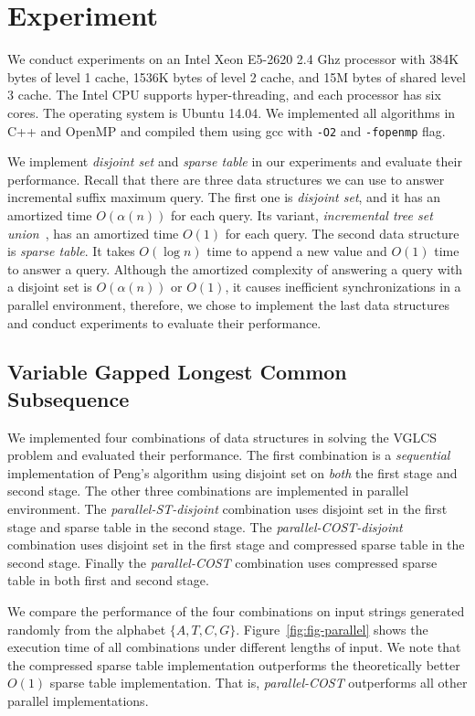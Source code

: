 \section{Experiment}
\label{sec:Experiment}

We conduct experiments on an Intel Xeon E5-2620 2.4 Ghz processor with
384K bytes of level 1 cache, 1536K bytes of level 2 cache, and 15M
bytes of shared level 3 cache.  The Intel CPU supports
hyper-threading, and each processor has six cores.  The operating
system is Ubuntu 14.04.  We implemented all algorithms in C++ and
OpenMP and compiled them using gcc with {\tt -O2} and {\tt -fopenmp}
flag.

We implement {\em disjoint set} and {\em sparse table} in our
experiments and evaluate their performance.  Recall that there are three
data structures we can use to answer incremental suffix maximum query.
The first one is {\em disjoint set}, and it has an amortized time
$O(\alpha(n))$ for each query.  Its variant, {\em incremental   tree set
union}~\cite{Gabow1983ALA}, has an amortized time $O(1)$ for each query.
The second data structure is {\em sparse table}.  It takes $O(\log n)$
time to append a new value and $O(1)$ time to answer a query.  Although
the amortized complexity of answering a query with a disjoint set is
$O(\alpha(n))$ or $O(1)$, it causes inefficient synchronizations in a
parallel environment, therefore, we chose to implement the last data
structures and conduct experiments to evaluate their performance.

\subsection{Variable Gapped Longest Common Subsequence}

We implemented four combinations of data structures in solving the
VGLCS problem and evaluated their performance.  The first combination
is a {\em sequential} implementation of Peng's algorithm using
disjoint set on {\em both} the first stage and second stage.  The
other three combinations are implemented in parallel environment.  The
{\em parallel-ST-disjoint} combination uses disjoint set in the first
stage and sparse table in the second stage.  The {\em
  parallel-COST-disjoint} combination uses disjoint set in the first
stage and compressed sparse table in the second stage.  Finally the
{\em parallel-COST} combination uses compressed sparse table in both
first and second stage.

We compare the performance of the four combinations on input strings
generated randomly from the alphabet $\{A, T, C, G\}$.
Figure~\ref{fig:fig-parallel} shows the execution time of all
combinations under different lengths of input.  We note that the
compressed sparse table implementation outperforms the theoretically
better $O(1)$ sparse table implementation.  %
That is, {\em parallel-COST} outperforms all other parallel implementations.

